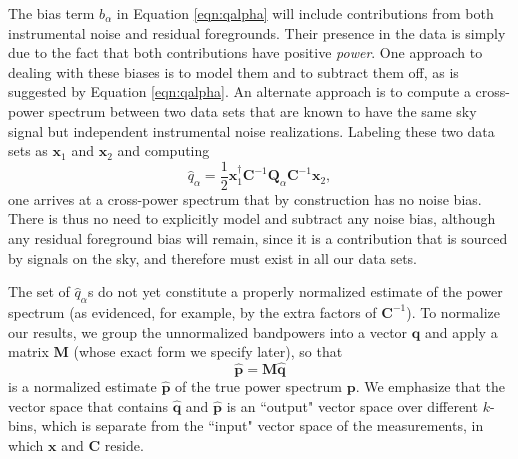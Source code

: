 \documentclass[twocolumn,numberedappendix]{emulateapj} \shorttitle{New Limits on the 21 cm Power Spectrum at $z=8.4$}
\newcommand{\x}{\mathbf{x}} \newcommand{\xhat}{\hat{\mathbf{x}}}
\begin{document}
The bias term $b_{\alpha}$ in Equation \eqref{eqn:qalpha} will include contributions
from both instrumental noise and residual foregrounds. Their presence in the data
is simply due to the fact that both contributions have positive \emph{power}. One
approach to dealing with these biases is to model them and to subtract them off,
as is suggested by Equation \eqref{eqn:qalpha}. An alternate approach is to
compute a cross-power spectrum between two data sets that are known to have
the same sky signal but independent instrumental noise realizations. Labeling
these two data sets as $\x_1$ and $\x_2$ and computing
\begin{equation}\label{eqn:qalpha_unbiased}
    \hat{q}_{\alpha} =
\frac{1}{2}\x_{1}^\dagger\mathbf{C}^{-1}\mathbf{Q}_{\alpha}\mathbf{C}^{-1}\x_{2},
\end{equation}
one arrives at a cross-power spectrum that by construction has no noise bias. There is
thus no need to explicitly model and subtract any noise bias, although any residual foreground
bias will remain, since it is a contribution that is sourced by signals on the sky, and therefore
must exist in all our data sets.

The set of $\hat{q}_{\alpha}$s do not yet constitute a properly normalized estimate of
the power spectrum (as evidenced, for example, by the extra factors of $\mathbf{C}^{-1}$). 
To normalize our results, we group the unnormalized bandpowers into a vector $\mathbf{\hat{q}}$
and apply a matrix $\mathbf{M}$ (whose exact form we specify later), so that
\begin{equation}\label{eqn:pspec_norm}
    \mathbf{\hat{p}} = \mathbf{M}\hat{\mathbf{q}}
\end{equation}
is a normalized estimate $\mathbf{\hat{p}}$ of the true power spectrum $\mathbf{p}$. We emphasize
that the vector space that contains $\hat{\mathbf{q}}$ and $\hat{\mathbf{p}}$ is an ``output" vector
space over different $k$-bins, which is separate from the ``input" vector space of the measurements, in which $\x$ and $\mathbf{C}$ reside.
\end{document}

